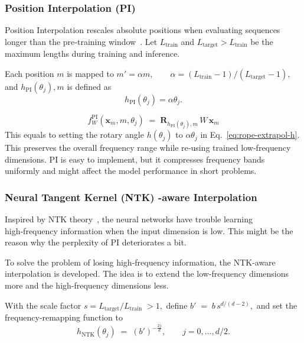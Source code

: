 \subsubsection{Position Interpolation (PI)}
Position Interpolation rescales absolute positions when evaluating sequences longer than the pre‑training window~\cite{chen2023extending}.  Let $L_{\text{train}}$ and $L_{\text{target}}>L_{\text{train}}$ be the maximum lengths during training and inference. 

Each position $m$ is mapped to
$
m'=\alpha m,\qquad \alpha=(L_{\text{train}}-1)/(L_{\text{target}}-1),
\label{eq:pi_scale}
$ and $h_{\text{PI}}(\theta_j),m$ is defined as 
$$h_{\text{PI}}(\theta_j)=\alpha \theta_j.$$ 
\begin{definition}\label{def:pi}
\begin{equation}
  f_W^{\text{PI}}(\mathbf x_m,m,\theta_j)
  \;=\;
  \mathbf R_{h_{\text{PI}}(\theta_j),m}\,
  W\,\mathbf x_m 
  \label{eq:pi-final}
\end{equation}
 This equals to setting the rotary angle $h(\theta_j)$ to $\alpha \theta_j$ in Eq.~\eqref{eq:rope-extrapol-h}.  This preserves the overall frequency range while re‑using trained low‑frequency dimensions. PI is easy to implement, but it compresses frequency bands uniformly and might affect the model performance in short problems.
\end{definition}

\subsubsection{Neural Tangent Kernel (NTK) -aware Interpolation}
Inspired by NTK theory~\cite{tancik2020fourier}, the neural networks have trouble learning high‑frequency information when the input dimension is low. This might be the reason why the perplexity of PI deteriorates a bit.

To solve the problem of losing high-frequency information, the NTK-aware~\cite{bloc97_ntk_rope_2023} interpolation is developed. The idea is to extend the low-frequency dimensions more and the high-frequency dimensions less.

With the scale factor
$
  s=L_{\text{target}}/L_{\text{train}}\;>1,
$
define
$
  b' \;=\; b \, s^{d/(d-2)},
  \label{eq:ntk-base}
$
and set the frequency‑remapping function to
\begin{equation}
  h_{\text{NTK}}(\theta_j)
  \;=\;
  (b')^{-\tfrac{2j}{d}},
  \qquad
  j=0,\dots,d/2 .
  \label{eq:ntk-h}
\end{equation}

